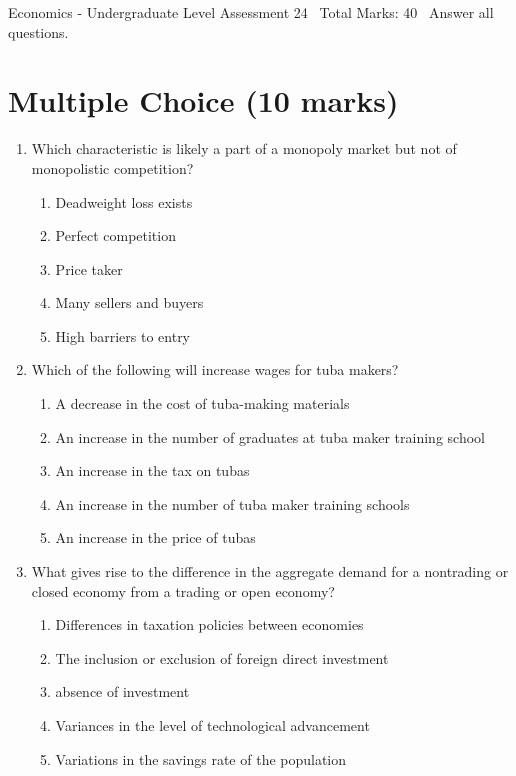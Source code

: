 \documentclass[12pt]{article}
\begin{document}
\begin{center}
Economics - Undergraduate Level Assessment 24 \
Total Marks: 40 \
Answer all questions.
\end{center}

\section*{Multiple Choice (10 marks)}
\begin{enumerate}[label=\arabic*.]
\item Which characteristic is likely a part of a monopoly market but not of monopolistic competition?
\begin{enumerate}[label=(\alph*)]
    \item Deadweight loss exists
    \item Perfect competition
    \item Price taker
    \item Many sellers and buyers
    \item High barriers to entry
\end{enumerate}
\item Which of the following will increase wages for tuba makers?
\begin{enumerate}[label=(\alph*)]
    \item A decrease in the cost of tuba-making materials
    \item An increase in the number of graduates at tuba maker training school
    \item An increase in the tax on tubas
    \item An increase in the number of tuba maker training schools
    \item An increase in the price of tubas
\end{enumerate}
\item What gives rise to the difference in the aggregate demand for a nontrading or closed economy from a trading or open economy?
\begin{enumerate}[label=(\alph*)]
    \item Differences in taxation policies between economies
    \item The inclusion or exclusion of foreign direct investment
    \item absence of investment
    \item Variances in the level of technological advancement
    \item Variations in the savings rate of the population
\end{enumerate}

\end{enumerate}
\end{document}
